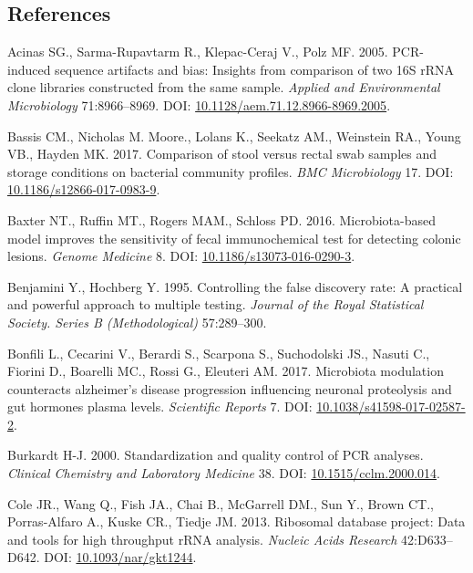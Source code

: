 \documentclass[11pt,]{article}
\begin{document}
\newpage

\subsection{References}\label{references}

\hypertarget{refs}{}
\hypertarget{ref-Acinas2005}{}
Acinas SG., Sarma-Rupavtarm R., Klepac-Ceraj V., Polz MF. 2005.
PCR-induced sequence artifacts and bias: Insights from comparison of two
16S rRNA clone libraries constructed from the same sample. \emph{Applied
and Environmental Microbiology} 71:8966--8969. DOI:
\href{https://doi.org/10.1128/aem.71.12.8966-8969.2005}{10.1128/aem.71.12.8966-8969.2005}.

\hypertarget{ref-storage_Bassis_2017}{}
Bassis CM., Nicholas M. Moore., Lolans K., Seekatz AM., Weinstein RA.,
Young VB., Hayden MK. 2017. Comparison of stool versus rectal swab
samples and storage conditions on bacterial community profiles.
\emph{BMC Microbiology} 17. DOI:
\href{https://doi.org/10.1186/s12866-017-0983-9}{10.1186/s12866-017-0983-9}.

\hypertarget{ref-Baxter2016}{}
Baxter NT., Ruffin MT., Rogers MAM., Schloss PD. 2016. Microbiota-based
model improves the sensitivity of fecal immunochemical test for
detecting colonic lesions. \emph{Genome Medicine} 8. DOI:
\href{https://doi.org/10.1186/s13073-016-0290-3}{10.1186/s13073-016-0290-3}.

\hypertarget{ref-benjamini_controlling_1995}{}
Benjamini Y., Hochberg Y. 1995. Controlling the false discovery rate: A
practical and powerful approach to multiple testing. \emph{Journal of
the Royal Statistical Society. Series B (Methodological)} 57:289--300.

\hypertarget{ref-Bonfili2017}{}
Bonfili L., Cecarini V., Berardi S., Scarpona S., Suchodolski JS.,
Nasuti C., Fiorini D., Boarelli MC., Rossi G., Eleuteri AM. 2017.
Microbiota modulation counteracts alzheimer's disease progression
influencing neuronal proteolysis and gut hormones plasma levels.
\emph{Scientific Reports} 7. DOI:
\href{https://doi.org/10.1038/s41598-017-02587-2}{10.1038/s41598-017-02587-2}.

\hypertarget{ref-Burkardt2000}{}
Burkardt H-J. 2000. Standardization and quality control of PCR analyses.
\emph{Clinical Chemistry and Laboratory Medicine} 38. DOI:
\href{https://doi.org/10.1515/cclm.2000.014}{10.1515/cclm.2000.014}.

\hypertarget{ref-rdp_Cole_2013}{}
Cole JR., Wang Q., Fish JA., Chai B., McGarrell DM., Sun Y., Brown CT.,
Porras-Alfaro A., Kuske CR., Tiedje JM. 2013. Ribosomal database
project: Data and tools for high throughput rRNA analysis. \emph{Nucleic
Acids Research} 42:D633--D642. DOI:
\href{https://doi.org/10.1093/nar/gkt1244}{10.1093/nar/gkt1244}.
\end{document}
